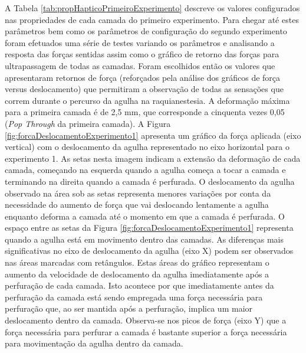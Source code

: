 A Tabela \ref{tab:propHapticoPrimeiroExperimento} descreve os valores configurados nas propriedades de cada camada do primeiro experimento. Para chegar até estes parâmetros bem como os parâmetros de configuração do segundo experimento foram efetuados uma série de testes variando os parâmetros e analisando a resposta das forças sentidas assim como o gráfico de retorno das forças para ultrapassagem de todas as camadas. Foram escolhidos então os valores que apresentaram retornos de força (reforçados pela análise dos gráficos de força versus deslocamento) que permitiram a observação de todas as sensações que correm durante o percurso da agulha na raquianestesia. A deformação máxima para a primeira camada é de 2,5 mm, que corresponde a cinquenta vezes 0,05 (\textit{Pop Through} da primeira camada). A Figura \ref{fig:forcaDeslocamentoExperimento1} apresenta um gráfico da força aplicada (eixo vertical) com o deslocamento da agulha representado no eixo horizontal para o experimento 1. As setas nesta imagem indicam a extensão da deformação de cada camada, começando na esquerda quando a agulha começa a tocar a camada e terminando na direita quando a camada é perfurada. O deslocamento da agulha observado na área sob as setas representa menores variações por conta da necessidade do aumento de força que vai deslocando lentamente a agulha enquanto deforma a camada até o momento em que a camada é perfurada. O espaço entre as setas da Figura \ref{fig:forcaDeslocamentoExperimento1} representa quando a agulha está em movimento dentro das camadas. 
As diferenças mais significativas no eixo de deslocamento da agulha (eixo X) podem ser observados nas áreas marcadas com retângulos. Estas áreas do gráfico representam o aumento da velocidade de deslocamento da agulha imediatamente após a perfuração de cada camada. Isto acontece por que imediatamente antes da perfuração da camada está sendo empregada uma força necessária para perfuração que, ao ser mantida após a perfuração, implica um maior deslocamento dentro da camada. Observa-se nos picos de força (eixo Y) que a força necessária para perfurar a camada é bastante superior a força necessária para movimentação da agulha dentro da camada. 

